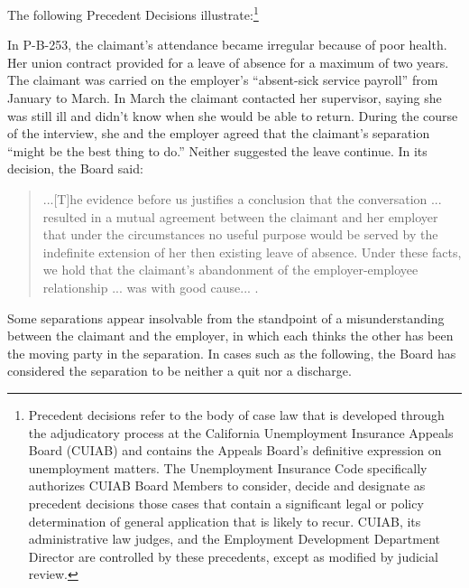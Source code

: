 \documentclass[12pt]{article}
\newcommand{\1}{\mathbf{1}}
\begin{document}
\begin{appendix}
The following Precedent Decisions illustrate:\footnote{Precedent decisions refer to the body of case law that is developed through the adjudicatory process at the California Unemployment Insurance Appeals Board (CUIAB) and contains the Appeals Board's definitive expression on unemployment matters. The Unemployment Insurance Code specifically authorizes CUIAB Board Members to consider, decide and designate as precedent decisions those cases that contain a significant legal or policy determination of general application that is likely to recur. CUIAB, its administrative law judges, and the Employment Development Department Director are controlled by these precedents, except as modified by judicial review.}


In P-B-253, the claimant's attendance became irregular because of poor health. Her union contract provided for a leave of absence for a maximum of two years.
The claimant was carried on the employer's ``absent-sick service payroll'' from January to March. In March the claimant contacted her supervisor, saying she was still ill and didn't know when she would be able to return. During the course of the interview, she and the employer agreed that the claimant's separation ``might be the best thing to do.'' Neither suggested the leave continue. In its decision, the Board said:
\begin{quotation}
...[T]he evidence before us justifies a conclusion that the conversation ... resulted in a mutual agreement between the claimant and her employer that under the circumstances no useful purpose would be served by the indefinite extension of her then existing leave of absence. Under these facts, we hold that the claimant's abandonment of the employer-employee relationship ... was with good cause... .
\end{quotation}

Some separations appear insolvable from the standpoint of a misunderstanding between the claimant and the employer, in which each thinks the other has been the moving party in the separation. In cases such as the following, the Board has considered the separation to be neither a quit nor a discharge.


\end{appendix}
\end{document}
